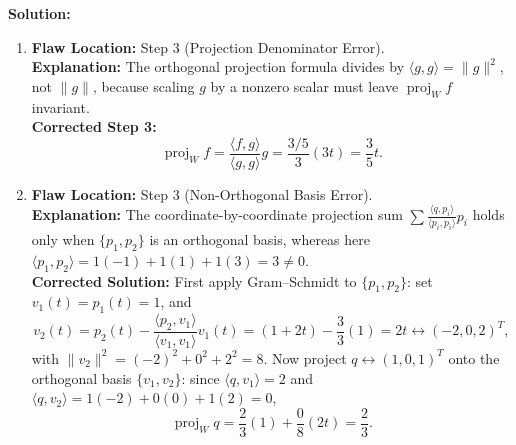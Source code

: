 \documentclass[11pt, letterpaper]{article}
\theoremstyle{definition}
\theoremstyle{remark}
\begin{document}
\textbf{Solution:}
\begin{enumerate}[label=(\alph*)]
    \item \textbf{Flaw Location:} Step 3 (Projection Denominator Error).\\
    \textbf{Explanation:} The orthogonal projection formula divides by $\langle g, g \rangle = \|g\|^2$, not $\|g\|$, because scaling $g$ by a nonzero scalar must leave $\operatorname{proj}_W f$ invariant.\\
    \textbf{Corrected Step 3:}
    \[
    \operatorname{proj}_W f = \frac{\langle f, g \rangle}{\langle g, g \rangle}g = \frac{3/5}{3}(3t) = \frac{3}{5}t.
    \]
    \item \textbf{Flaw Location:} Step 3 (Non-Orthogonal Basis Error).\\
    \textbf{Explanation:} The coordinate-by-coordinate projection sum $\sum \frac{\langle q, p_i \rangle}{\langle p_i, p_i \rangle}p_i$ holds only when $\{p_1, p_2\}$ is an orthogonal basis, whereas here $\langle p_1, p_2 \rangle = 1(-1) + 1(1) + 1(3) = 3 \neq 0$.\\
    \textbf{Corrected Solution:} First apply Gram--Schmidt to $\{p_1, p_2\}$: set $v_1(t) = p_1(t) = 1$, and
    \[
    v_2(t) = p_2(t) - \frac{\langle p_2, v_1 \rangle}{\langle v_1, v_1 \rangle}v_1(t) = (1 + 2t) - \frac{3}{3}(1) = 2t \leftrightarrow (-2, 0, 2)^T,
    \]
    with $\|v_2\|^2 = (-2)^2 + 0^2 + 2^2 = 8$. Now project $q \leftrightarrow (1, 0, 1)^T$ onto the orthogonal basis $\{v_1, v_2\}$: since $\langle q, v_1 \rangle = 2$ and $\langle q, v_2 \rangle = 1(-2) + 0(0) + 1(2) = 0$,
    \[
    \operatorname{proj}_W q = \frac{2}{3}(1) + \frac{0}{8}(2t) = \frac{2}{3}.
    \]
\end{enumerate}

\medskip
\end{document}

